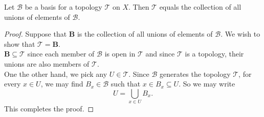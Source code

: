 \begin{theorem}\label{thm:topology-equals-union-of-basis}
    Let \( \mathscr{B} \) be a basis for a topology \( \mathscr{T} \) on \( X \). Then \( \mathscr{T} \) equals the collection of all unions of elements of \( \mathscr{B} \).
\end{theorem}
\begin{proof}
    Suppose that \( \mathbf{B} \) is the collection of all unions of elements of \( \mathscr{B} \). We wish to show that \( \mathscr{T} = \mathbf{B} \).\\ \( \mathbf{B} \subseteq \mathscr{T} \) since each member of \( \mathscr{B} \) is open in \( \mathscr{T} \) and since \( \mathscr{T} \) is a topology, their unions are also members of \( \mathscr{T} \). \\ One the other hand, we pick any \( U \in \mathscr{T} \). Since \( \mathscr{B} \) generates the topology \( \mathscr{T} \), for every \( x \in U \), we may find \( B_{x} \in \mathscr{B} \) such that \( x \in B_{x} \subseteq U \). So we may write
    \[ U = \bigcup_{x \in U} B_{x}. \]
    This completes the proof.
\end{proof}

